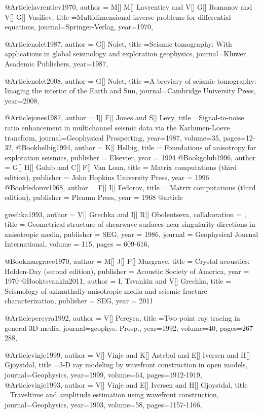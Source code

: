 {@Article{lavrentiev1970,
  author = {M[] M[] Lavrentiev and V[] G[] Romanov and V[] G[] Vasiliev},
  title ={Multidimensional inverse problems for differential equations},
  journal={Springer-Verlag},
  year=1970,
}

@Article{nolet1987,
  author = {G[] Nolet},
  title ={Seismic tomography: With applications in global seismology and exploration geophysics},
  journal={Kluwer Academic Publishers},
  year=1987,
}

@Article{nolet2008,
  author = {G[] Nolet},
  title ={A breviary of seismic tomography: Imaging the interior of the Earth and Sun},
  journal={Cambridge University Press},
  year=2008,
}

@Article{jones1987,
  author = {I[] F[] Jones and S[] Levy},
  title ={Signal-to-noise ratio enhancement in multichannel seismic data via the Karhunen-Loeve transform},
  journal={Geophysical Prospecting},
  year=1987,
  volume=35,
  pages={12-32},
}
@Book{helbig1994,
  author =	 {K[] Helbig},
  title =	 {Foundations of anisotropy for exploration seismics},
  publisher =	 {Elsevier},
  year =	 1994
}
@Book{golub1996,
  author =	 {G[] H[] Golub and C[] F[] Van Loan},
  title =	 {Matrix computations (third edition)},
  publisher =	 {John Hopkins University Press},
  year =	 1996
}
@Book{fedorov1968,
  author =	 {F[] I[] Fedorov},
  title =	 {Matrix computations (third edition)},
  publisher =	 {Plenum Press},
  year =	 1968
}
@article{grechka1993,
author = {V[] Grechka and I[] R[] Obolentseva},
collaboration = {},
title = {Geometrical structure of shearwave
surfaces near singularity directions in anisotropic media},
publisher = {SEG},
year = {1986},
journal = {Geophysical Journal International},
volume = {115},
pages = {609-616},

}

@Book{musgrave1970,
  author =	 {M[] J[] P[] Musgrave},
  title =	 {Crystal acoustics: Holden-Day (second edition)},
  publisher =	 {Acoustic Society of America},
  year =	 1970
}
@Book{tsvankin2011,
  author =	 {I. Tsvankin and V[] Grechka},
  title =	 {Seismology of azimuthally anisotropic media and seismic fracture characterization},
  publisher =	 {SEG},
  year =	 2011
}

@Article{pereyra1992,
  author = {V[] Pereyra},
  title ={Two-point ray tracing in general 3{D} media},
  journal={geophys. Prosp.},
  year=1992,
  volume=40,
  pages={267-288},
}


@Article{vinje1999,
  author = {V[] Vinje and K[] Astebol and E[] Iversen and H[] Gjoystdal},
  title ={3-D ray modeling by wavefront construction in open models},
  journal={Geophysics},
  year=1999,
  volume=64,
  pages={1912-1919},
}
@Article{vinje1993,
  author = {V[] Vinje and E[] Iversen and H[] Gjoystdal},
  title ={Traveltime and amplitude estimation using wavefront construction},
  journal={Geophysics},
  year=1993,
  volume=58,
  pages={1157-1166},
}


}
